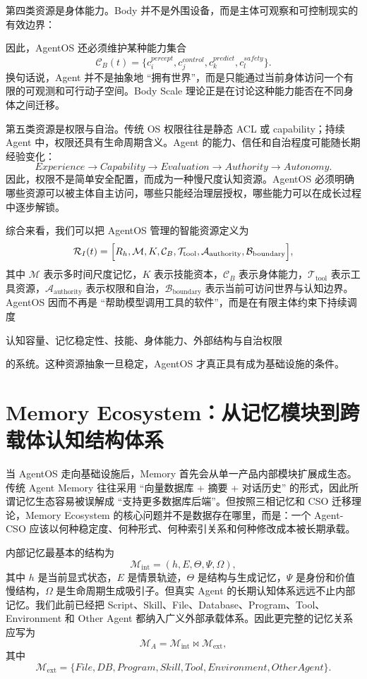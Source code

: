 第四类资源是身体能力。Body 并不是外围设备，而是主体可观察和可控制现实的有效边界：
\begin{statementbox}
\centering
{}
\end{statementbox}
因此，AgentOS 还必须维护某种能力集合
\[
\mathcal C_B(t)
=
\{
c^{percept}_i,
c^{control}_j,
c^{predict}_k,
c^{safety}_l
\}.
\]
换句话说，Agent 并不是抽象地 ``拥有世界''，而是只能通过当前身体访问一个有限的可观测和可行动子空间。Body Scale 理论正是在讨论这种能力能否在不同身体之间迁移。

第五类资源是权限与自治。传统 OS 权限往往是静态 ACL 或 capability；持续 Agent 中，权限还具有生命周期含义。Agent 的能力、信任和自治程度可能随长期经验变化：
\[
Experience
\rightarrow
Capability
\rightarrow
Evaluation
\rightarrow
Authority
\rightarrow
Autonomy.
\]
因此，权限不是简单安全配置，而成为一种慢尺度认知资源。AgentOS 必须明确哪些资源可以被主体自主访问，哪些只能经治理层授权，哪些能力可以在成长过程中逐步解锁。

综合来看，我们可以把 AgentOS 管理的智能资源定义为
\[
\mathcal R_I(t)
=
\Bigl[
R_h,
\mathcal M,
K,
\mathcal C_B,
\mathcal T_{\mathrm{tool}},
\mathcal A_{\mathrm{authority}},
\mathcal B_{\mathrm{boundary}}
\Bigr],
\]
其中 $\mathcal M$ 表示多时间尺度记忆，$K$ 表示技能资本，$\mathcal C_B$ 表示身体能力，$\mathcal T_{\mathrm{tool}}$ 表示工具资源，$\mathcal A_{\mathrm{authority}}$ 表示权限和自治，$\mathcal B_{\mathrm{boundary}}$ 表示当前可访问世界与认知边界。AgentOS 因而不再是 ``帮助模型调用工具的软件''，而是在有限主体约束下持续调度
\begin{remark}
认知容量、记忆稳定性、技能、身体能力、外部结构与自治权限
\end{remark}
的系统。这种资源抽象一旦稳定，AgentOS 才真正具有成为基础设施的条件。

\section{Memory Ecosystem：从记忆模块到跨载体认知结构体系}

当 AgentOS 走向基础设施后，Memory 首先会从单一产品内部模块扩展成生态。传统 Agent Memory 往往采用 ``向量数据库 + 摘要 + 对话历史'' 的形式，因此所谓记忆生态容易被误解成 ``支持更多数据库后端''。但按照三相记忆和 CSO 迁移理论，Memory Ecosystem 的核心问题并不是数据存在哪里，而是：一个 Agent-CSO 应该以何种稳定度、何种形式、何种索引关系和何种修改成本被长期承载。

内部记忆最基本的结构为
\[
\mathcal M_{\mathrm{int}}
=
(h,E,\Theta,\Psi,\Omega),
\]
其中 $h$ 是当前显式状态，$E$ 是情景轨迹，$\Theta$ 是结构与生成记忆，$\Psi$ 是身份和价值慢结构，$\Omega$ 是生命周期生成吸引子。但真实 Agent 的长期认知体系远远不止内部记忆。我们此前已经把 Script、Skill、File、Database、Program、Tool、Environment 和 Other Agent 都纳入广义外部承载体系。因此更完整的记忆关系应写为
\[
\mathcal M_A
=
\mathcal M_{\mathrm{int}}
\bowtie
\mathcal M_{\mathrm{ext}},
\]
其中
\[
\mathcal M_{\mathrm{ext}}
=
\{
File,DB,Program,Skill,Tool,Environment,OtherAgent
\}.
\]

